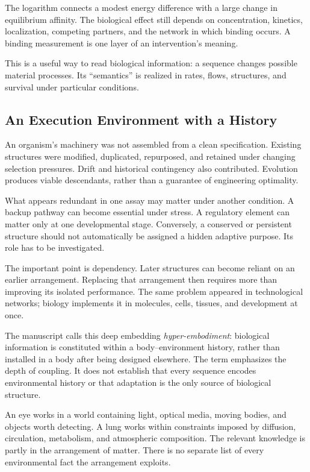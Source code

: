The logarithm connects a modest energy difference with a large change in equilibrium affinity. The biological effect still depends on concentration, kinetics, localization, competing partners, and the network in which binding occurs. A binding measurement is one layer of an intervention's meaning.

This is a useful way to read biological information: a sequence changes possible material processes. Its “semantics” is realized in rates, flows, structures, and survival under particular conditions.

\subsection{An Execution Environment with a History}

An organism's machinery was not assembled from a clean specification. Existing structures were modified, duplicated, repurposed, and retained under changing selection pressures. Drift and historical contingency also contributed. Evolution produces viable descendants, rather than a guarantee of engineering optimality.

What appears redundant in one assay may matter under another condition. A backup pathway can become essential under stress. A regulatory element can matter only at one developmental stage. Conversely, a conserved or persistent structure should not automatically be assigned a hidden adaptive purpose. Its role has to be investigated.

The important point is dependency. Later structures can become reliant on an earlier arrangement. Replacing that arrangement then requires more than improving its isolated performance. The same problem appeared in technological networks; biology implements it in molecules, cells, tissues, and development at once.

The manuscript calls this deep embedding \emph{hyper-embodiment}: biological information is constituted within a body--environment history, rather than installed in a body after being designed elsewhere. The term emphasizes the depth of coupling. It does not establish that every sequence encodes environmental history or that adaptation is the only source of biological structure.

An eye works in a world containing light, optical media, moving bodies, and objects worth detecting. A lung works within constraints imposed by diffusion, circulation, metabolism, and atmospheric composition. The relevant knowledge is partly in the arrangement of matter. There is no separate list of every environmental fact the arrangement exploits.

